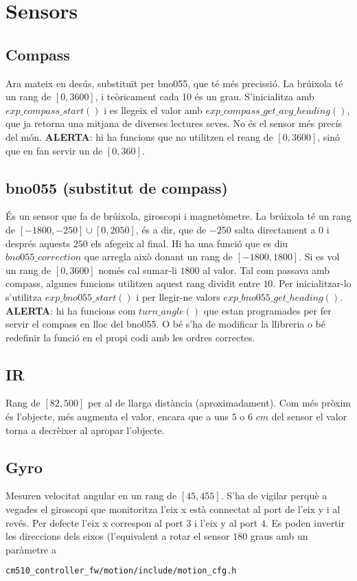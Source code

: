 \documentclass{article}
\begin{document}
\section{Sensors}
\subsection{Compass} Ara mateix en desús, substituït per bno055, que té més precissió. La brúixola té un rang de $[0, 3600]$, i teòricament cada 10 és un grau. S'inicialitza amb $exp\_compass\_start()$ i es llegeix el valor amb $exp\_compass\_get\_avg\_heading()$, que ja retorna una mitjana de diverses lectures seves. No és el sensor més precís del món. \textbf{ALERTA}: hi ha funcions que no utilitzen el reang de $[0, 3600]$, sinó que en fan servir un de $[0, 360]$.
\subsection{bno055 (substitut de compass)}
És un sensor que fa de brúixola, giroscopi i magnetòmetre. La brúixola té un rang de $[-1800, -250]\cup [0, 2050]$, és a dir, que de $-250$ salta directament a $0$ i després aquests $250$ els afegeix al final. Hi ha una funció que es diu $bno055\_correction$ que arregla això donant un rang de $[-1800, 1800]$. Si es vol un rang de $[0, 3600]$ només cal sumar-li $1800$ al valor. Tal com passava amb compass, algunes funcions utilitzen aquest rang dividit entre $10$. Per inicialitzar-lo s'utilitza $exp\_bno055\_start()$ i per llegir-ne valors $exp\_bno055\_get\_heading()$. \textbf{ALERTA}: hi ha funcions com $turn\_angle()$ que estan programades per fer servir el compass en lloc del bno055. O bé s'ha de modificar la llibreria o bé redefinir la funció en el propi codi amb les ordres correctes.

\subsection{IR}
Rang de $[82, 500]$ per al de llarga distància (aproximadament). Com més pròxim és l'objecte, més augmenta el valor, encara que a uns $5$ o $6$ $cm$ del sensor el valor torna a decrèixer al apropar l'objecte.

\subsection{Gyro} 
Mesuren velocitat angular en un rang de $[45, 455]$. S'ha de vigilar perquè a vegades el giroscopi que monitoritza l'eix x està connectat al port de l'eix y i al revés. Per defecte l'eix x correspon al port $3$ i l'eix y al port $4$. Es poden invertir les direccions dels eixos (l'equivalent a rotar el sensor $180$ graus amb un paràmetre a 
\begin{lstlisting}[language=bash]
cm510_controller_fw/motion/include/motion_cfg.h
\end{lstlisting}
\end{document}
